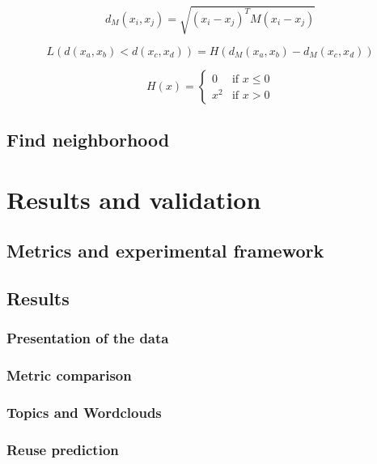 \documentclass[a4paper]{article}
\begin{document}
	\begin{equation}
		d_{M}(x_{i}, x_{j}) = \sqrt{(x_{i} - x_{j})^{T}M(x_{i} - x_{j})}
	\end{equation}
	
	\begin{equation}
		L(d(x_{a}, x_{b}) < d(x_{c}, x_{d})) = H(d_{M}(x_{a}, x_{b}) - d_{M}(x_{c}, x_{d}))
	\end{equation}
	
	\begin{equation}
		H(x) = \begin{cases}
				0 & \mbox{if } x \leq 0 \\
				x^{2} & \mbox{if } x > 0
			   \end{cases}
	\end{equation}
	
	\subsection{Find neighborhood}
	
	\section{Results and validation}
	
	\subsection{Metrics and experimental framework}
	
	\subsection{Results}
	
	\subsubsection{Presentation of the data}
	
	\subsubsection{Metric comparison}
	
	\subsubsection{Topics and Wordclouds}
	
	\subsubsection{Reuse prediction}
	
\end{document}
